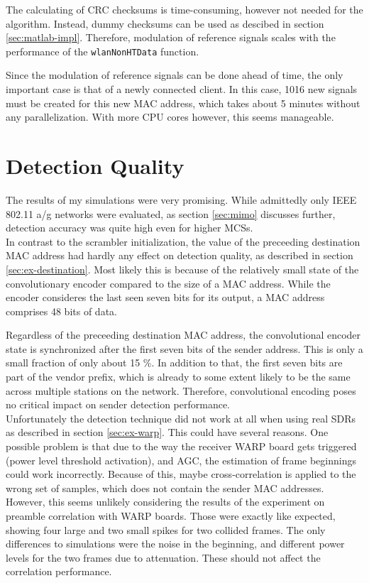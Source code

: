 The calculating of CRC checksums is time-consuming, however not needed for the algorithm. Instead, dummy checksums can be used as descibed in section \ref{sec:matlab-impl}. Therefore, modulation of reference signals scales with the performance of the \texttt{wlanNonHTData} function.

Since the modulation of reference signals can be done ahead of time, the only important case is that of a newly connected client. In this case, 1016 new signals must be created for this new MAC address, which takes about 5 minutes without any parallelization. With more CPU cores however, this seems manageable.



\section{Detection Quality}\label{sec:detection-quality}

The results of my simulations were very promising. While admittedly only IEEE 802.11 a/g networks were evaluated, as section \ref{sec:mimo} discusses further, detection accuracy was quite high even for higher \glspl{MCS}.\\

In contrast to the scrambler initialization, the value of the preceeding destination MAC address had hardly any effect on detection quality, as described in section \ref{sec:ex-destination}. Most likely this is because of the relatively small state of the convolutionary encoder compared to the size of a MAC address. While the encoder consideres the last seen seven bits for its output, a MAC address comprises 48 bits of data.

Regardless of the preceeding destination MAC address, the convolutional encoder state is synchronized after the first seven bits of the sender address. This is only a small fraction of only about 15 \%. In addition to that, the first seven bits are part of the vendor prefix, which is already to some extent likely to be the same across multiple stations on the network. Therefore, convolutional encoding poses no critical impact on sender detection performance.\\

Unfortunately the detection technique did not work at all when using real \glspl{SDR} as described in section \ref{sec:ex-warp}. This could have several reasons. One possible problem is that due to the way the receiver \gls{WARP} board gets triggered (power level threshold activation), and \gls{AGC}, the estimation of frame beginnings could work incorrectly. Because of this, maybe cross-correlation is applied to the wrong set of samples, which does not contain the sender MAC addresses. However, this seems unlikely considering the results of the experiment on preamble correlation with \gls{WARP} boards. Those were exactly like expected, showing four large and two small spikes for two collided frames. The only differences to simulations were the noise in the beginning, and different power levels for the two frames due to attenuation. These should not affect the correlation performance.


